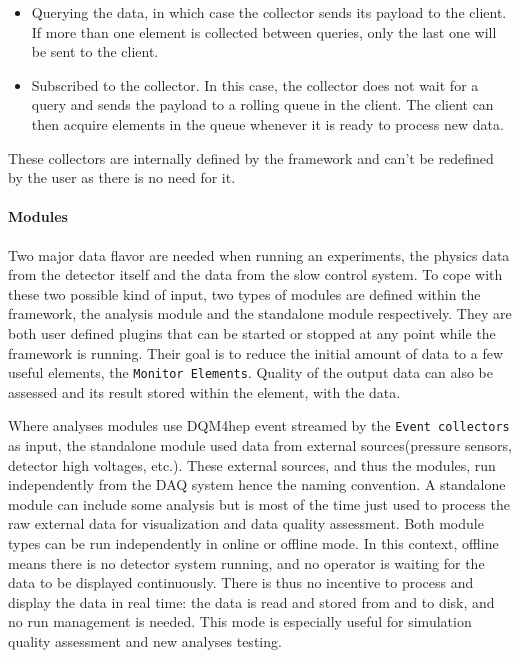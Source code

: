 \documentclass{webofc}
\begin{document}
\begin{itemize}
  \item Querying the data, in which case the collector sends its payload to the client. If more than one element is collected between queries, only the last one will be sent to the client.
  \item Subscribed to the collector. In this case, the collector does not wait for a query and sends the payload to a rolling queue in the client. The client can then acquire elements in the queue whenever it is ready to process new data.  
\end{itemize}

These collectors are internally defined by the framework and can't be redefined by the user as there is no need for it. 

\paragraph{Modules}\label{par:Modules}
Two major data flavor are needed when running an experiments, the physics data from the detector itself and the data from the slow control system.
To cope with these two possible kind of input, two types of modules are defined within the framework, the analysis module and the standalone module respectively.
They are both user defined plugins that can be started or stopped at any point while the framework is running.
Their goal is to reduce the initial amount of data to a few useful elements, the \texttt{Monitor Elements}.
Quality of the output data can also be assessed and its result stored within the element, with the data.

Where analyses modules use DQM4hep event streamed by the \texttt{Event collectors} as input, the standalone module 
used data from external sources(pressure sensors, detector high voltages, etc.).
These external sources, and thus the modules, run independently from the DAQ system hence the naming convention. 
A standalone module can include some analysis but is most of the time just used to process the raw external data for visualization and data quality assessment. 
Both module types can be run independently in online or offline mode. In this context, offline means there is no detector system running, and no operator is waiting for the data to be displayed continuously. There is thus no incentive to process and display the data in real time: the data is read and stored from and to disk, and no run management is needed. This mode is especially useful for simulation quality assessment and new analyses testing. 
\end{document}
